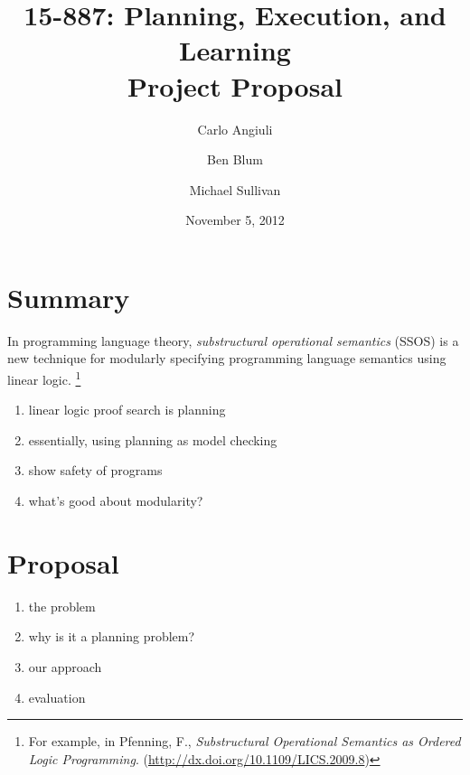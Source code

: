\documentclass{article}
\title{
{\large 15-887: Planning, Execution, and Learning}\\
Project Proposal}
\author{Carlo Angiuli \and Ben Blum \and Michael Sullivan}
\date{November 5, 2012}
\begin{document}
\maketitle

\section{Summary}

In programming language theory, \emph{substructural operational semantics}
(SSOS) is a new technique for modularly specifying programming language
semantics using linear logic.%
\footnote{For example, in Pfenning, F.,
\textit{Substructural Operational Semantics as Ordered Logic Programming}.
(\url{http://dx.doi.org/10.1109/LICS.2009.8})}

\begin{enumerate}
\item linear logic proof search is planning
\item essentially, using planning as model checking
\item show safety of programs
\item what's good about modularity?
\end{enumerate}

\section{Proposal}

\begin{enumerate}
\item the problem
\item why is it a planning problem?
\item our approach
\item evaluation
\end{enumerate}
\end{document}
